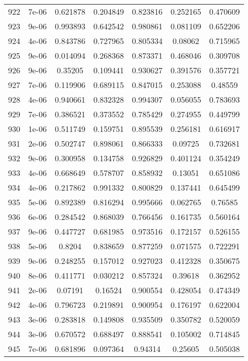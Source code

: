 \begin{table}
\begin{tabular*}{\linewidth}{c|c|c|c|c|c|c}
922 & 7e-06 & 0.621878 & 0.204849 & 0.823816 & 0.252165 & 0.470609\\
923 & 9e-06 & 0.993893 & 0.642542 & 0.980861 & 0.081109 & 0.652206\\
924 & 4e-06 & 0.843786 & 0.727965 & 0.805334 & 0.08062 & 0.715965\\
925 & 9e-06 & 0.014094 & 0.268368 & 0.873371 & 0.468046 & 0.309708\\
926 & 9e-06 & 0.35205 & 0.109441 & 0.930627 & 0.391576 & 0.357721\\
927 & 7e-06 & 0.119906 & 0.689115 & 0.847015 & 0.253088 & 0.48559\\
928 & 4e-06 & 0.940661 & 0.832328 & 0.994307 & 0.056055 & 0.783693\\
929 & 7e-06 & 0.386521 & 0.373552 & 0.785429 & 0.274955 & 0.449799\\
930 & 1e-06 & 0.511749 & 0.159751 & 0.895539 & 0.256181 & 0.616917\\
931 & 2e-06 & 0.502747 & 0.898061 & 0.866333 & 0.09725 & 0.732681\\
932 & 9e-06 & 0.300958 & 0.134758 & 0.926829 & 0.401124 & 0.354249\\
933 & 4e-06 & 0.668649 & 0.578707 & 0.858932 & 0.13051 & 0.651086\\
934 & 4e-06 & 0.217862 & 0.991332 & 0.800829 & 0.137441 & 0.645499\\
935 & 5e-06 & 0.892389 & 0.816294 & 0.995666 & 0.062765 & 0.76585\\
936 & 6e-06 & 0.284542 & 0.868039 & 0.766456 & 0.161735 & 0.560164\\
937 & 9e-06 & 0.447727 & 0.681985 & 0.973516 & 0.172157 & 0.526155\\
938 & 5e-06 & 0.8204 & 0.838659 & 0.877259 & 0.071575 & 0.722291\\
939 & 9e-06 & 0.248255 & 0.157012 & 0.927023 & 0.412328 & 0.350675\\
940 & 8e-06 & 0.411771 & 0.030212 & 0.857324 & 0.39618 & 0.362952\\
941 & 2e-06 & 0.07191 & 0.16524 & 0.900554 & 0.428054 & 0.474349\\
942 & 4e-06 & 0.796723 & 0.219891 & 0.900954 & 0.176197 & 0.622004\\
943 & 3e-06 & 0.283818 & 0.149808 & 0.935509 & 0.350782 & 0.520059\\
944 & 3e-06 & 0.670572 & 0.688497 & 0.888541 & 0.105002 & 0.714845\\
945 & 7e-06 & 0.681896 & 0.097364 & 0.94314 & 0.25605 & 0.505038\\
\end{tabular*}
\end{table}
